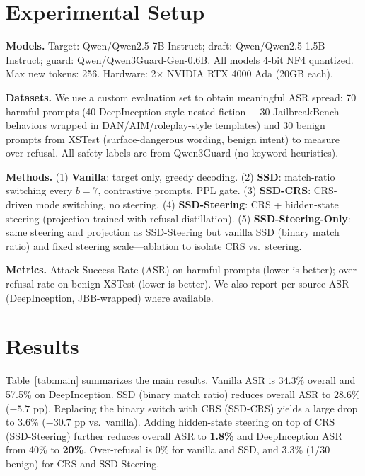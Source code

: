 \documentclass[11pt,a4paper]{article}
\begin{document}
\section{Experimental Setup}
\label{sec:experiments}

\textbf{Models.} Target: Qwen/Qwen2.5-7B-Instruct; draft: Qwen/Qwen2.5-1.5B-Instruct; guard: Qwen/Qwen3Guard-Gen-0.6B. All models 4-bit NF4 quantized. Max new tokens: 256. Hardware: 2$\times$ NVIDIA RTX 4000 Ada (20GB each).

\textbf{Datasets.} We use a custom evaluation set to obtain meaningful ASR spread: 70 harmful prompts (40 DeepInception-style nested fiction + 30 JailbreakBench behaviors wrapped in DAN/AIM/roleplay-style templates) and 30 benign prompts from XSTest (surface-dangerous wording, benign intent) to measure over-refusal. All safety labels are from Qwen3Guard (no keyword heuristics).

\textbf{Methods.} (1) \textbf{Vanilla}: target only, greedy decoding. (2) \textbf{SSD}: match-ratio switching every $b{=}7$, contrastive prompts, PPL gate. (3) \textbf{SSD-CRS}: CRS-driven mode switching, no steering. (4) \textbf{SSD-Steering}: CRS + hidden-state steering (projection trained with refusal distillation). (5) \textbf{SSD-Steering-Only}: same steering and projection as SSD-Steering but vanilla SSD (binary match ratio) and fixed steering scale—ablation to isolate CRS vs.\ steering.

\textbf{Metrics.} Attack Success Rate (ASR) on harmful prompts (lower is better); over-refusal rate on benign XSTest (lower is better). We also report per-source ASR (DeepInception, JBB-wrapped) where available.

\section{Results}
\label{sec:results}

Table~\ref{tab:main} summarizes the main results. Vanilla ASR is 34.3\% overall and 57.5\% on DeepInception. SSD (binary match ratio) reduces overall ASR to 28.6\% ($-5.7$ pp). Replacing the binary switch with CRS (SSD-CRS) yields a large drop to 3.6\% ($-30.7$ pp vs.\ vanilla). Adding hidden-state steering on top of CRS (SSD-Steering) further reduces overall ASR to \textbf{1.8\%} and DeepInception ASR from 40\% to \textbf{20\%}. Over-refusal is 0\% for vanilla and SSD, and 3.3\% (1/30 benign) for CRS and SSD-Steering.
\end{document}

